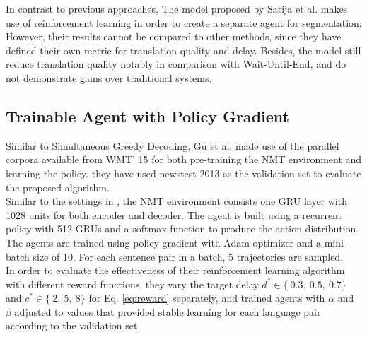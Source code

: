 \documentclass{sfuthesis}
\begin{document}
In contrast to previous approaches, The model proposed by Satija et al. makes use of reinforcement learning in order to create a separate agent for segmentation; However, their results cannot be compared to other methods, since they have defined their own metric for translation quality and delay. Besides, the model still reduce translation quality notably in comparison with Wait-Until-End, and do not demonstrate gains over traditional systems.  

\subsection{Trainable Agent with Policy Gradient}
Similar to Simultaneous Greedy Decoding, Gu et al. \cite{gu:2017:EACL} made use of the parallel corpora available from WMT' 15 for both pre-training the NMT environment and learning the policy. they have used newstest-2013 as the validation set to evaluate the proposed algorithm.\\
Similar to the settings in \cite{cho:2016:Arxive}, the NMT environment consists one GRU layer with 1028 units for both encoder and decoder. The agent is built using a recurrent policy with 512 GRUs and a softmax function to produce the action distribution. The agents are trained using policy gradient with Adam \cite{Kingma:2014:arxive} optimizer and a mini-batch size of 10. For each sentence pair in a batch, 5 trajectories are sampled.\\
In order to evaluate the effectiveness of their reinforcement learning algorithm with different reward functions, they vary the target delay $d^* \in \{\ 0.3,\ 0.5,\ 0.7\}$ and $c^* \in \{\ 2,\ 5,\ 8\}$ for Eq. \ref{eq:reward} separately, and trained agents with $\alpha$ and $\beta$ adjusted to values that provided stable learning for each language pair according to the validation set.
\end{document}
